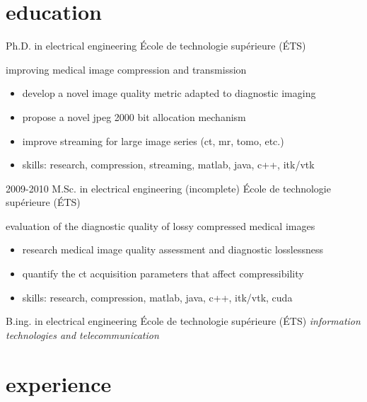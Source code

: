 \documentclass[print]{friggeri-cv}
\begin{document}


\section{education}
\begin{entrylist}
  {Ph.D. in electrical engineering} 
  {École de technologie supérieure {\scriptsize (ÉTS)}}
  {improving medical image compression and transmission
  \begin{itemize}
    \item develop a novel image quality metric adapted to diagnostic imaging
    \item propose a novel jpeg 2000 bit allocation mechanism
    \item improve streaming for large image series (ct, mr, tomo, etc.)
    \item skills: research, compression, streaming, matlab, java, c++, itk/vtk
  \end{itemize}}

  \entry
  {2009-2010}
  {M.Sc. in electrical engineering (incomplete\textsuperscript{\tiny\textdaggerdbl})}
  {École de technologie supérieure {\scriptsize (ÉTS)}}
  {evaluation of the diagnostic quality of lossy compressed medical images
  \begin{itemize}
    \item research medical image quality assessment and diagnostic losslessness
    \item quantify the ct acquisition parameters that affect compressibility
    \item skills: research, compression, matlab, java, c++, itk/vtk, cuda
  \end{itemize}}

   {B.ing. in electrical engineering}
  {École de technologie supérieure {\scriptsize (ÉTS)}}
  {\emph{information technologies and telecommunication}}

\end{entrylist}

\vspace{5mm}

\section{experience}
\end{document}
